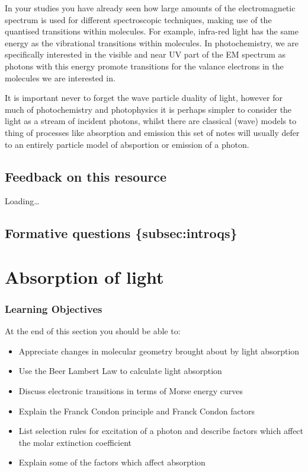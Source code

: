 \documentclass[
]{book}
\providecommand{\tightlist}{%
  \setlength{\itemsep}{0pt}\setlength{\parskip}{0pt}}
\begin{document}
In your studies you have already seen how large amounts of the electromagnetic spectrum is used for different spectroscopic techniques, making use of the quantised transitions within molecules. For example, infra-red light has the same energy as the vibrational transitions within molecules. In photochemistry, we are specifically interested in the visible and near UV part of the EM spectrum as photons with this energy promote transitions for the valance electrons in the molecules we are interested in.

It is important never to forget the wave particle duality of light, however for much of photochemistry and photophysics it is perhaps simpler to consider the light as a stream of incident photons, whilst there are classical (wave) models to thing of processes like absorption and emission this set of notes will usually defer to an entirely particle model of absportion or emission of a photon.

\hypertarget{feedback-on-this-resource}{%
\section*{Feedback on this resource}\label{feedback-on-this-resource}}

Loading\ldots{}

\hypertarget{formative-questions-subsecintroqs}{%
\section{Formative questions \{subsec:introqs\}}\label{formative-questions-subsecintroqs}}

\hypertarget{ch:Abs}{%
\chapter{Absorption of light}\label{ch:Abs}}

\hypertarget{sec:AbsLOs}{%
\subsection{Learning Objectives}\label{sec:AbsLOs}}

At the end of this section you should be able to:

\begin{itemize}
\tightlist
\item
  Appreciate changes in molecular geometry brought about by light absorption
\item
  Use the Beer Lambert Law to calculate light absorption
\item
  Discuss electronic transitions in terms of Morse energy curves
\item
  Explain the Franck Condon principle and Franck Condon factors
\item
  List selection rules for excitation of a photon and describe factors which affect the molar extinction coefficient
\item
  Explain some of the factors which affect absorption
\end{itemize}
\end{document}
